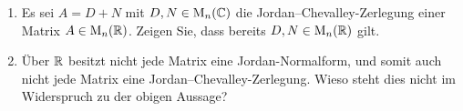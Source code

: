 \documentclass[a4paper, 10pt]{scrartcl}
\begin{document}
\begin{question}
  \begin{enumerate}
    \item
      Es sei $A = D + N$ mit $D, N \in \operatorname{M}_{n}(\mathbb{C})$ die Jordan--Chevalley-Zerlegung einer Matrix $A \in \operatorname{M}_{n}(\mathbb{R})$.
      Zeigen Sie, dass bereits $D, N \in \operatorname{M}_{n}(\mathbb{R})$ gilt.
    \item
      Über $\mathbb{R}$ besitzt nicht jede Matrix eine Jordan-Normalform, und somit auch nicht jede Matrix eine Jordan--Chevalley-Zerlegung.
      Wieso steht dies nicht im Widerspruch zu der obigen Aussage?
  \end{enumerate}
\end{question}
\end{document}

